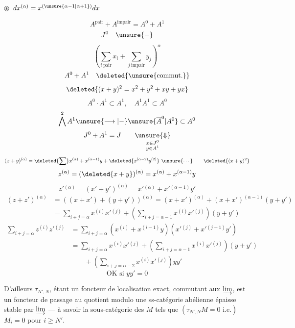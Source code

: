 {$\circledast$\ $d x^{(\alpha)}=x^{(\unsure{\alpha-1|\alpha+1})}dx$

\[
A^{\mathrm{pair}}+A^{\mathrm{impair}}=A^0+A^1
\]
\[
J^0\quad\unsure{-}
\]
\[
\left(\sum_{i\ \mathrm{pair}}x_i+\sum_{j\ \mathrm{impair}}y_j\right)^\alpha
\]
\[
A^0+A^1\quad\deleted{\unsure{\text{commut.}}}
\]
\[
\deleted{(x+y)^2=x^2+y^2+xy+yx}
\]
\[
A^0\cdot A^1\subset A^1,\quad A^1 A^1\subset A^0
\]
\[
\bigwedge^2 A^1\unsure{\longrightarrow|-}\unsure{\overline A^0|A^0}\subset A^0
\]
\[
J^0+A^1=J\qquad\underset{\substack{x\in J^0\\y\in A^1}}{\unsure{\Downarrow}}
\]
\[
(x+y)^{(\alpha)}=\deleted{\sum}x^{(\alpha)}+x^{(\alpha-1)}y+\deleted{x^{(\alpha-2)}y^{(2)}}\ \unsure{\cdots}\qquad\deleted{(x+y)^2}
\]
\[
z^{(\alpha)}=(\deleted{x+y})^{(\alpha)}=x^{(\alpha)}+x^{(\alpha-1)}y
\]
\[
z'{}^{(\alpha)}=(x'+y')^{(\alpha)}=x'{}^{(\alpha)}+x'{}^{(\alpha-1)}y'
\]
\[
\begin{aligned}
(z+z')^{(\alpha)}&=((x+x')+(y+y'))^{(\alpha)}=(x+x')^{(\alpha)}+(x+x')^{(\alpha-1)}(y+y')\\
&=\sum_{i+j=\alpha}x^{(i)}x'{}^{(j)}+\left(\sum_{i+j=\alpha-1}x^{(i)}x'{}^{(j)}\right)(y+y')
\end{aligned}
\]
\[
\begin{aligned}
\sum_{i+j=\alpha}z^{(i)}z'{}^{(j)}&=\sum_{i+j=\alpha}(x^{(i)}+x^{(i-1)}y)(x'{}^{(j)}+x'{}^{(j-1)}y')\\
&=\sum_{i+j=\alpha}x^{(i)}x'{}^{(j)}+\left(\sum_{i+j=\alpha-1}x^{(i)}x'{}^{(j)}\right)(y+y')\\
&\qquad+\left(\sum_{i+j=\alpha-2}x^{(i)}x'{}^{(j)}\right)yy'
\end{aligned}
\]
\[
\boxed{\text{OK si }yy'=0}
\]
}
D'ailleurs $\tau_{N',N}$, étant un foncteur de localisation exact, commutant aux $\varinjlim$, est un foncteur de passage au quotient modulo une ss-catégorie abélienne épaisse stable par $\varinjlim$ --- à savoir la sous-catégorie des $M$ \deleted{\unsure{\{} } tels que  $(\tau_{N',N}M=0\text{ i.e.})$ $M_i=0$ pour $i\geq N'$.

